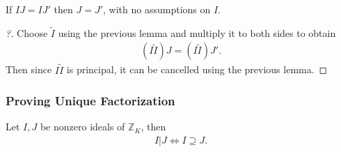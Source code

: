 \begin{proposition}[$\Id(\ZZ_K)$ is Cancellative]

If \(IJ = IJ'\) then \(J = J'\), with no assumptions on \(I\).

\end{proposition}

\begin{proof}[?]

Choose \(\tilde I\) using the previous lemma and multiply it to both
sides to obtain
\begin{align*}
(I \tilde I) J = (I \tilde I) J'
.\end{align*}
Then since \(I\tilde I\) is principal, it can be cancelled using the
previous lemma.

\end{proof}

\hypertarget{proving-unique-factorization}{%
\subsubsection{Proving Unique
Factorization}\label{proving-unique-factorization}}

\begin{theorem}

Let \(I, J\) be nonzero ideals of \({\mathbb{Z}}_K\), then
\begin{align*}
I \mathrel{\Big|}J \iff I \supseteq J
.\end{align*}

\end{theorem}

